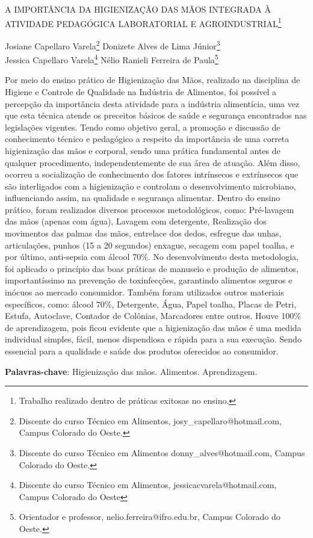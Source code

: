 \documentclass[article,12pt,onesidea,4paper,english,brazil]{abntex2}
\begin{document}
	
	
	\frenchspacing 
	
	\begin{center}
		\LARGE A IMPORTÂNCIA DA HIGIENIZAÇÃO DAS MÃOS INTEGRADA À ATIVIDADE
		PEDAGÓGICA LABORATORIAL E AGROINDUSTRIAL\footnote{Trabalho realizado dentro de práticas exitosas no ensino.}
		
		\normalsize
	Josiane Capellaro Varela\footnote{Discente do curso Técnico em Alimentos, josy\_capellaro@hotmail.com, Campus Colorado do Oeste.} 
		Donizete Alves de Lima Júnior\footnote{Discente do curso Técnico em Alimentos donny\_alves@hotmail.com, Campus Colorado do Oeste.} \\
	Jessica Capellaro Varela\footnote{Discente do curso Técnico em Alimentos, jessicacvarela@hotmail.com, Campus Colorado do Oeste} 
	Nélio Ranieli Ferreira de Paula\footnote{Orientador e professor, nelio.ferreira@ifro.edu.br, Campus Colorado do Oeste.} 
	\end{center}
	
	\noindent Por meio do ensino prático de Higienização das Mãos, realizado na disciplina de
	Higiene e Controle de Qualidade na Indústria de Alimentos, foi possível a percepção
	da importância desta atividade para a indústria alimentícia, uma vez que esta técnica
	atende os preceitos básicos de saúde e segurança encontrados nas legislações
	vigentes. Tendo como objetivo geral, a promoção e discussão de conhecimento
	técnico e pedagógico a respeito da importância de uma correta higienização das
	mãos e corporal, sendo uma prática fundamental antes de qualquer procedimento,
	independentemente de sua área de atuação. Além disso, ocorreu a socialização de
	conhecimento dos fatores intrínsecos e extrínsecos que são interligados com a
	higienização e controlam o desenvolvimento microbiano, influenciando assim, na
	qualidade e segurança alimentar. Dentro do ensino prático, foram realizados
	diversos processos metodológicos, como: Pré-lavagem das mãos (apenas com
	água), Lavagem com detergente, Realização dos movimentos das palmas das
	mãos, entrelace dos dedos, esfregue das unhas, articulações, punhos (15 a 20
	segundos) enxague, secagem com papel toalha, e por último, anti-sepsia com álcool
	70\%. No desenvolvimento desta metodologia, foi aplicado o princípio das boas
	práticas de manuseio e produção de alimentos, importantíssimo na prevenção de
	toxinfecções, garantindo alimentos seguros e inócuos ao mercado consumidor.
	Também foram utilizados outros materiais específicos, como: álcool 70\%,
	Detergente, Água, Papel toalha, Placas de Petri, Estufa, Autoclave, Contador de
	Colônias, Marcadores entre outros. Houve 100\% de aprendizagem, pois ficou
	evidente que a higienização das mãos é uma medida individual simples, fácil, menos
	dispendiosa e rápida para a sua execução. Sendo essencial para a qualidade e
	saúde dos produtos oferecidos ao consumidor.
	
	\vspace{\onelineskip}
	
	\noindent
	\textbf{Palavras-chave}: Higienização das mãos. Alimentos. Aprendizagem.
	
\end{document}
